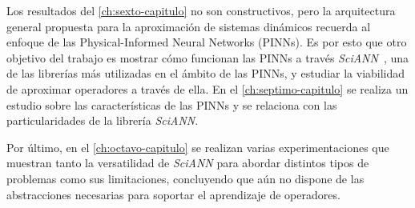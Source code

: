 Los resultados del \autoref{ch:sexto-capitulo} no son constructivos, pero la arquitectura general propuesta para la aproximación de sistemas dinámicos recuerda al enfoque de las Physical-Informed Neural Networks (PINNs). Es por esto que otro objetivo del trabajo es mostrar cómo funcionan las PINNs a través \textit{SciANN}~\cite{Haghighat2021}, una de las librerías más utilizadas en el ámbito de las PINNs, y estudiar la viabilidad de aproximar operadores a través de ella. En el \autoref{ch:septimo-capitulo} se realiza un estudio sobre las características de las PINNs y se relaciona con las particularidades de la librería \textit{SciANN}. 

Por último, en el \autoref{ch:octavo-capitulo} se realizan varias experimentaciones que muestran tanto la versatilidad de \textit{SciANN} para abordar distintos tipos de problemas como sus limitaciones, concluyendo que aún no dispone de las abstracciones necesarias para soportar el aprendizaje de operadores.







\endinput
